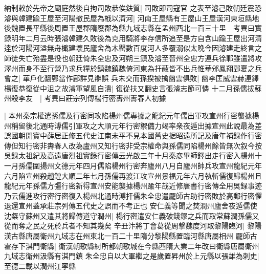 納制敕於先帝之廟庭然後自拘司敗恭俟鈇質|{
	司敗即司寇官}
之表至濬己敗朝廷震恐濬與韓建踰王屋至河陽撤民屋為栰以濟河|{
	河南王屋縣有王屋山王屋漢河東垣縣地後魏置長平縣後周置王屋郡隋廢郡為縣九域志縣在孟州西北一百三十里　考異曰實録明年二月云時張濬韓建久敗後為克用騎將李存信所追至是方自含山踰王屋出河清逹於河陽河溢無舟檝建壞民廬舍為木罌數百度河人多覆溺似太晩今因濬建走終言之}
師徒失亡殆盡是役也朝廷倚朱全忠及河朔三鎮及濬至晉州全忠方連兵徐鄆雖遣將攻澤州而身不至行營乃求兵糧於鎮魏鎮魏倚河東為扞蔽皆不出兵惟華邠鳳翔鄄夏之兵會之|{
	華戶化翻鄄當作鄜詳見辯誤}
兵未交而孫揆被擒幽雲俱敗|{
	幽李匡威雲赫連鐸}
楊復恭復從中沮之故濬軍望風自潰|{
	復從扶又翻史言張濬志節可憐}
十二月孫儒拔蘇州殺李友　|{
	考異曰莊宗列傳楊行密夀州夀春人初據}


|{
	本州秦宗權遣孫儒及行密同攻陷楊州儒專據之龍紀元年儒出軍攻宣州行密襲據楊州稱留後北通時溥儒引軍攻之大順元年行密禦備力竭率衆夜遁出據宣州此說最為差誤國朝開寶中薛居正修五代史江南未平不見本國舊史据昭遠所記及唐年補録作行密傳但知行密非夀春人改為盧州又知行密非受宗權命與孫儒同陷楊州餘皆無次叙今按吳録太祖紀及高遠唐烈祖實錄行密傳云光啟三年十月秦彦畢師鐸出走行密入楊州十一月孫儒圍揚州文德元年四月儒陷楊州行密奔廬州八月自廬州帥兵攻宣州龍紀元年六月陷宣州殺趙鍠大順二年七月孫儒再渡江攻宣州景福元年六月執斬儒復歸楊州且龍紀元年孫儒方彊行密新得宣州安能襲據楊州踰年哉近修唐書行密傳全用吳録事迹乃云儒進攻行密行密復入楊州北通時溥扞儒朱全忠遣龎師古助行密敗於高郵行密懼退還宣州蓋承莊宗列傳五代史之誤而不考正也}
安仁義等聞之焚潤州廬舍夜遁儒使沈粲守蘇州又遣其將歸傳道守潤州|{
	楊行密遣安仁義破錢鏐之兵而取常蘇潤孫儒又從而奪之民之死於兵者不知其幾矣}
辛丑汴將丁會葛從周撃魏度河取黎陽臨河|{
	黎陽漢古縣唐屬衛州九域志在州東北一百二十里隋分黎陽縣置臨河縣唐屬相州}
龎師古霍存下淇門衛縣|{
	衛漢朝歌縣紂所都朝歌城在今縣西隋大業二年改曰衛縣唐屬衛州九域志衛州汲縣有淇門鎮}
朱全忠自以大軍繼之是歲置昇州於上元縣以張雄為刺史|{
	至德二載以潤州江寜縣}


